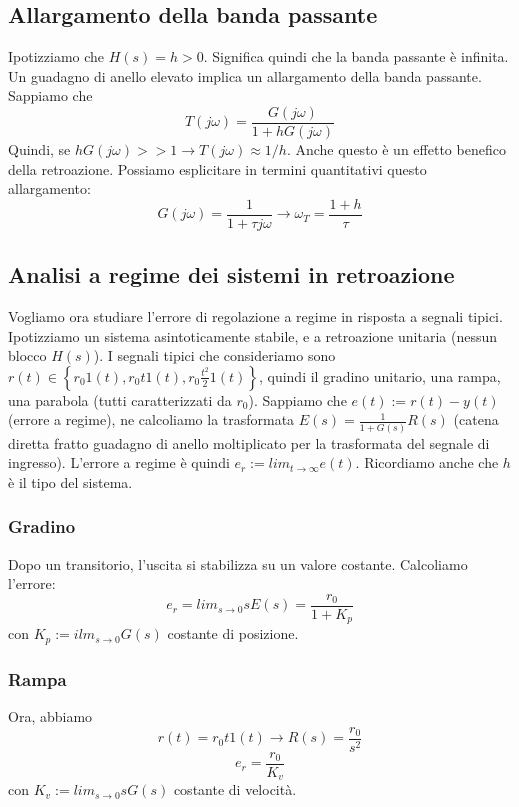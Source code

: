\documentclass[11pt]{article}
\begin{document}
\subsection{Allargamento della banda passante}
Ipotizziamo che $H(s) = h>0$. Significa quindi che la banda passante è infinita. Un guadagno di anello elevato implica un allargamento della banda passante. Sappiamo che \begin{displaymath}
    T(j\omega) = \frac{G(j\omega)}{1+hG(j\omega)}
\end{displaymath}
Quindi, se $hG(j\omega) >> 1 \rightarrow T(j\omega) \approx 1/h$.
Anche questo è un effetto benefico della retroazione. Possiamo esplicitare in termini quantitativi questo allargamento:
\begin{displaymath}
    G(j\omega)=\frac{1}{1+\tau j \omega} \rightarrow \omega_T = \frac{1+h}{\tau}
\end{displaymath}
\subsection{Analisi a regime dei sistemi in retroazione}
Vogliamo ora studiare l'errore di regolazione a regime in risposta a segnali tipici. Ipotizziamo un sistema asintoticamente stabile, e a retroazione unitaria (nessun blocco $H(s)$). I segnali tipici che consideriamo sono $r(t) \in \left\{r_0 1(t), r_0t1(t), r_0\frac{t^2}{2}1(t)\right\}$, quindi il gradino unitario, una rampa, una parabola (tutti caratterizzati da $r_0$). Sappiamo che $e(t) := r(t)-y(t)$ (errore a regime), ne calcoliamo la trasformata $E(s)=\frac{1}{1+G(s)}R(s)$ (catena diretta fratto guadagno di anello moltiplicato per la trasformata del segnale di ingresso). L'errore a regime è quindi $e_r := lim_{t\rightarrow\infty} e(t)$. Ricordiamo anche che $h$ è il tipo del sistema.
\subsubsection{Gradino}
Dopo un transitorio, l'uscita si stabilizza su un valore costante. Calcoliamo l'errore:
\begin{displaymath}
    e_r = lim_{s\rightarrow0} sE(s) = \frac{r_0}{1+K_p}
\end{displaymath}
con $K_p := ilm_{s\rightarrow0}G(s)$ costante di posizione.
\subsubsection{Rampa}
Ora, abbiamo
\begin{displaymath}
    r(t) = r_0 t1(t) \rightarrow R(s) = \frac{r_0}{s^2}
\end{displaymath}
\begin{displaymath}
    e_r = \frac{r_0}{K_v}
\end{displaymath}
con $K_v := lim_{s\rightarrow0}sG(s)$ costante di velocità.
\end{document}
